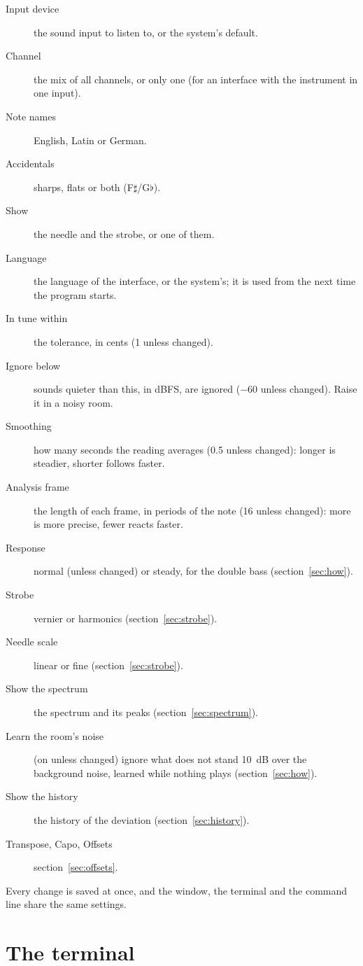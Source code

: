 \documentclass[12pt,
              article,
              oneside
              ]{memoir}
\begin{document}
\begin{description}
\item[Input device] the sound input to listen to, or the system's default.
\item[Channel] the mix of all channels, or only one (for an interface with
  the instrument in one input).
\item[Note names] English, Latin or German.
\item[Accidentals] sharps, flats or both (F$\sharp$/G$\flat$).
\item[Show] the needle and the strobe, or one of them.
\item[Language] the language of the interface, or the system's; it is used
  from the next time the program starts.
\item[In tune within] the tolerance, in cents (1 unless changed).
\item[Ignore below] sounds quieter than this, in dBFS, are ignored ($-60$
  unless changed). Raise it in a noisy room.
\item[Smoothing] how many seconds the reading averages (0.5 unless
  changed): longer is steadier, shorter follows faster.
\item[Analysis frame] the length of each frame, in periods of the note (16
  unless changed): more is more precise, fewer reacts faster.
\item[Response] normal (unless changed) or steady, for the double bass
  (section~\ref{sec:how}).
\item[Strobe] vernier or harmonics (section~\ref{sec:strobe}).
\item[Needle scale] linear or fine (section~\ref{sec:strobe}).
\item[Show the spectrum] the spectrum and its peaks
  (section~\ref{sec:spectrum}).
\item[Learn the room's noise] (on unless changed) ignore what does not
  stand 10~dB over the background noise, learned while nothing plays
  (section~\ref{sec:how}).
\item[Show the history] the history of the deviation
  (section~\ref{sec:history}).
\item[Transpose, Capo, Offsets] section~\ref{sec:offsets}.
\end{description}

\noindent Every change is saved at once, and the window, the terminal and
the command line share the same settings.

\section{The terminal}
\label{sec:tui}
\end{document}
